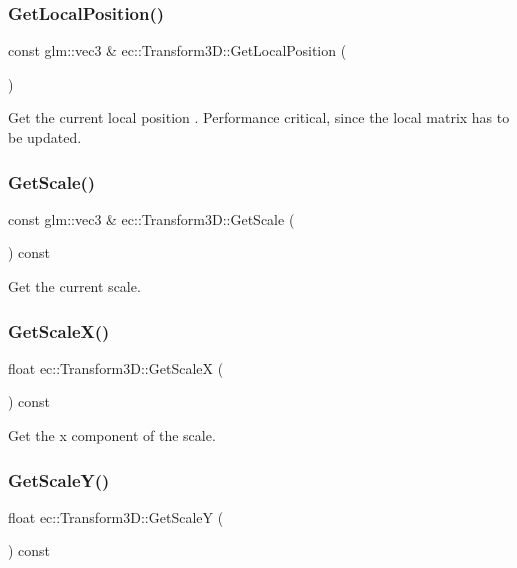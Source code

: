 \subsubsection{\texorpdfstring{Get\+Local\+Position()}{GetLocalPosition()}}
{\footnotesize\ttfamily const glm\+::vec3 \& ec\+::\+Transform3\+D\+::\+Get\+Local\+Position (\begin{DoxyParamCaption}{ }\end{DoxyParamCaption})}

Get the current local position . Performance critical, since the local matrix has to be updated. \mbox{\label{classec_1_1_transform3_d_a8819e33e87e8a8cf0086c156b0072a4d}} 
\subsubsection{\texorpdfstring{Get\+Scale()}{GetScale()}}
{\footnotesize\ttfamily const glm\+::vec3 \& ec\+::\+Transform3\+D\+::\+Get\+Scale (\begin{DoxyParamCaption}{ }\end{DoxyParamCaption}) const}

Get the current scale. \mbox{\label{classec_1_1_transform3_d_a34c610a94a2802100447d053a7866b85}} 
\subsubsection{\texorpdfstring{Get\+Scale\+X()}{GetScaleX()}}
{\footnotesize\ttfamily float ec\+::\+Transform3\+D\+::\+Get\+ScaleX (\begin{DoxyParamCaption}{ }\end{DoxyParamCaption}) const}

Get the x component of the scale. \mbox{\label{classec_1_1_transform3_d_abfa421cde566209e669eba461cdafb16}} 
\subsubsection{\texorpdfstring{Get\+Scale\+Y()}{GetScaleY()}}
{\footnotesize\ttfamily float ec\+::\+Transform3\+D\+::\+Get\+ScaleY (\begin{DoxyParamCaption}{ }\end{DoxyParamCaption}) const}

